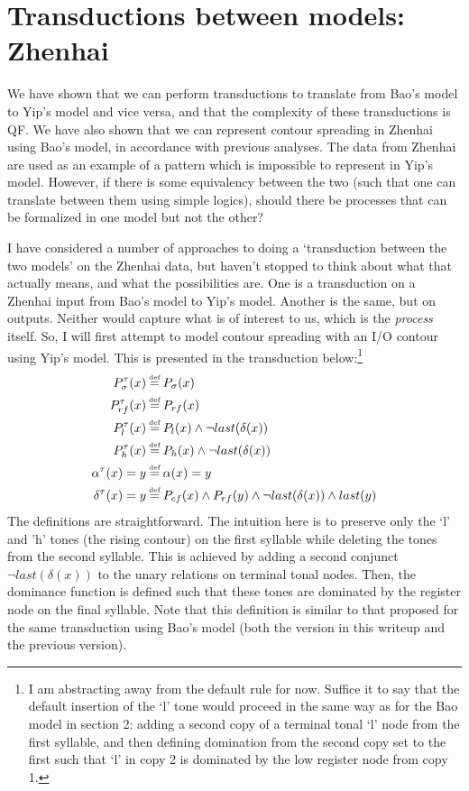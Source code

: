 \documentclass{article}
\newcommand\myeq{\mathrel{\stackrel{\makebox[0pt]{\mbox{\normalfont\tiny def}}}{=}}}
\begin{document}
\section{Transductions between models: Zhenhai}
We have shown that we can perform transductions to translate from Bao's model to Yip's model and vice versa, and that the complexity of these transductions is QF. We have also shown that we can represent contour spreading in Zhenhai using Bao's model, in accordance with previous analyses. The data from Zhenhai are used as an example of a pattern which is impossible to represent in Yip's model. However, if there is some equivalency between the two (such that one can translate between them using simple logics), should there be processes that can be formalized in one model but not the other? \par
I have considered a number of approaches to doing a `transduction between the two models' on the Zhenhai data, but haven't stopped to think about what that actually means, and what the possibilities are. One is a transduction on a Zhenhai input from Bao's model to Yip's model. Another is the same, but on outputs. Neither would capture what is of interest to us, which is the \emph{process} itself. So, I will first attempt to model contour spreading with an I/O contour using Yip's model. This is presented in the transduction below:\footnote{I am abstracting away from the default rule for now. Suffice it to say that the default insertion of the `l' tone would proceed in the same way as for the Bao model in section 2: adding a second copy of a terminal tonal `l' node from the first syllable, and then defining domination from the second copy set to the first such that `l' in copy 2 is dominated by the low register node from copy 1.}
\begin{equation}
\begin{aligned}
P^{\tau}_{\sigma}(x)&\myeq P_{\sigma}(x) \\
P^{\tau}_{rf}(x)&\myeq P_{rf}(x) \\
P^{\tau}_{l}(x)&\myeq P_{l}(x)\land \neg last(\delta(x)) \\
P^{\tau}_{h}(x)&\myeq P_{h}(x)\land \neg last(\delta(x)) \\
\alpha^{\tau}(x)=y&\myeq \alpha(x)=y \\
\delta^{\tau}(x)=y&\myeq P_{cf}(x)\land P_{rf}(y) \land \neg last(\delta(x))\land last(y)
\end{aligned}
\end{equation}
The definitions are straightforward. The intuition here is to preserve only the `l' and 'h' tones (the rising contour) on the first syllable while deleting the tones from the second syllable. This is achieved by adding a second conjunct $\neg last(\delta(x))$ to the unary relations on terminal tonal nodes. Then, the dominance function is defined such that these tones are dominated by the register node on the final syllable. Note that this definition is similar to that proposed for the same transduction using Bao's model (both the version in this writeup and the previous version). 
\end{document}
